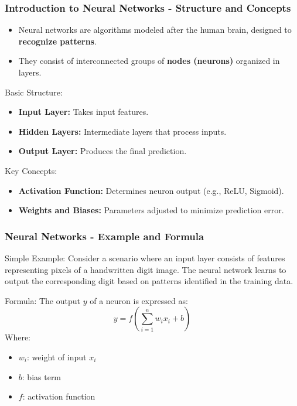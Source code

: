 \documentclass[aspectratio=169]{beamer}
\begin{document}
\begin{frame}[fragile]
    \frametitle{Introduction to Neural Networks - Structure and Concepts}
    \begin{itemize}
        \item Neural networks are algorithms modeled after the human brain, designed to \textbf{recognize patterns}.
        \item They consist of interconnected groups of \textbf{nodes (neurons)} organized in layers.
    \end{itemize}

    \begin{block}{Basic Structure:}
        \begin{itemize}
            \item \textbf{Input Layer:} Takes input features.
            \item \textbf{Hidden Layers:} Intermediate layers that process inputs.
            \item \textbf{Output Layer:} Produces the final prediction.
        \end{itemize}
    \end{block}

    \begin{block}{Key Concepts:}
        \begin{itemize}
            \item \textbf{Activation Function:} Determines neuron output (e.g., ReLU, Sigmoid).
            \item \textbf{Weights and Biases:} Parameters adjusted to minimize prediction error.
        \end{itemize}
    \end{block}
\end{frame}

\begin{frame}[fragile]
    \frametitle{Neural Networks - Example and Formula}
    \begin{block}{Simple Example:}
        Consider a scenario where an input layer consists of features representing pixels of a handwritten digit image. The neural network learns to output the corresponding digit based on patterns identified in the training data.
    \end{block}

    \begin{block}{Formula:}
        The output \( y \) of a neuron is expressed as:
        \begin{equation}
            y = f\left(\sum_{i=1}^{n} w_i x_i + b\right)
        \end{equation}
        Where:
        \begin{itemize}
            \item \( w_i \): weight of input \( x_i \)
            \item \( b \): bias term
            \item \( f \): activation function
        \end{itemize}
    \end{block}
\end{frame}
\end{document}
